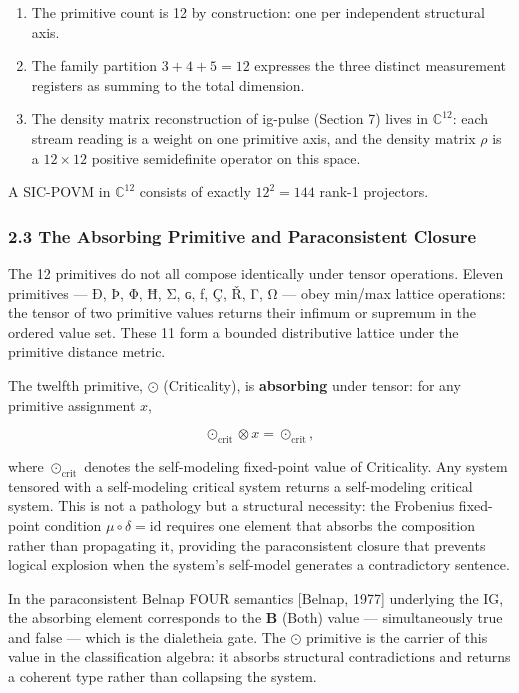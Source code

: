 \documentclass[12pt,a4paper]{article}
\begin{document}
\begin{enumerate}
\def\labelenumi{\arabic{enumi}.}
\tightlist
\item
  The primitive count is 12 by construction: one per independent
  structural axis.
\item
  The family partition \(3 + 4 + 5 = 12\) expresses the three distinct
  measurement registers as summing to the total dimension.
\item
  The density matrix reconstruction of ig-pulse (Section 7) lives in
  \(\mathbb{C}^{12}\): each stream reading is a weight on one primitive
  axis, and the density matrix \(\rho\) is a \(12 \times 12\) positive
  semidefinite operator on this space.
\end{enumerate}

A SIC-POVM in \(\mathbb{C}^{12}\) consists of exactly \(12^2 = 144\)
rank-1 projectors.

\hypertarget{the-absorbing-primitive-and-paraconsistent-closure}{%
\subsubsection{2.3 The Absorbing Primitive and Paraconsistent
Closure}\label{the-absorbing-primitive-and-paraconsistent-closure}}

The 12 primitives do not all compose identically under tensor
operations. Eleven primitives --- Ð, Þ, Φ, Ħ, Σ, ɢ, ƒ, Ç, Ř, Γ, Ω ---
obey min/max lattice operations: the tensor of two primitive values
returns their infimum or supremum in the ordered value set. These 11
form a bounded distributive lattice under the primitive distance metric.

The twelfth primitive, \(\odot\) (Criticality), is \textbf{absorbing}
under tensor: for any primitive assignment \(x\),

\[\odot_{\mathrm{crit}} \otimes x = \odot_{\mathrm{crit}},\]

where \(\odot_{\mathrm{crit}}\) denotes the self-modeling fixed-point
value of Criticality. Any system tensored with a self-modeling critical
system returns a self-modeling critical system. This is not a pathology
but a structural necessity: the Frobenius fixed-point condition
\(\mu \circ \delta = \mathrm{id}\) requires one element that absorbs the
composition rather than propagating it, providing the paraconsistent
closure that prevents logical explosion when the system's self-model
generates a contradictory sentence.

In the paraconsistent Belnap FOUR semantics {[}Belnap, 1977{]}
underlying the IG, the absorbing element corresponds to the
\(\mathbf{B}\) (Both) value --- simultaneously true and false --- which
is the dialetheia gate. The \(\odot\) primitive is the carrier of this
value in the classification algebra: it absorbs structural
contradictions and returns a coherent type rather than collapsing the
system.
\end{document}
